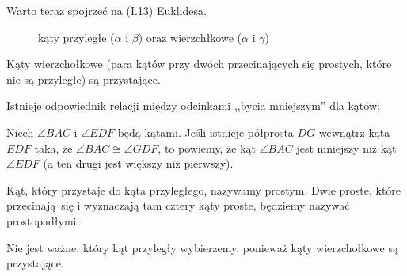 Warto teraz spojrzeć na (I.13) Euklidesa.

\begin{figure}[H] \centering
\begin{comment}
\begin{tikzpicture}[scale=.6]
    \tkzDefPoint(-4, -2){A}
    \tkzDefPoint(4, 2){B}
    \tkzDefPoint(4, -2){C}
    \tkzDefPoint(-4, 2){D}
    \tkzDefPoint(0, 0){Zero}
    \tkzDefPoint(0, 0.7){X1}
    \tkzDefPoint(-1.7, 0){X2}
    \tkzDefPoint(1.7, 0){X3}
    \tkzMarkAngle[arc=l,size=1.2,mark=||](D,Zero,A)
    \tkzMarkAngle[arc=l,size=1.2,mark=||](C,Zero,B)
    \tkzMarkAngle[arc=ll,size=1.2](B,Zero,D)

    \tkzDrawSegments[line width=0.3mm](A,B)
    \tkzDrawSegments[line width=0.3mm](C,D)
    \tkzLabelPoint[anchor=center](X1){$\beta$}
    \tkzLabelPoint[anchor=center](X2){$\alpha$}
    \tkzLabelPoint[anchor=center](X3){$\gamma$}

\end{tikzpicture}
\end{comment}
    \caption{kąty przyległe ($\alpha$ i $\beta$) oraz wierzchłkowe ($\alpha$ i $\gamma$)}
\end{figure}

\begin{proposition}
    Kąty wierzchołkowe (para kątów przy dwóch przecinających się prostych, które nie są przyległe) są przystające.
\end{proposition}


Istnieje odpowiednik relacji między odcinkami ,,bycia mniejszym'' dla kątów:

\begin{definition}
    Niech $\angle BAC$ i $\angle EDF$ będą kątami.
    Jeśli istnieje półprosta $DG$ wewnątrz kąta $EDF$ taka, że $\angle BAC \cong \angle GDF$, to powiemy, że kąt $\angle BAC$ jest mniejszy niż kąt $\angle EDF$ (a ten drugi jest większy niż pierwszy).
\end{definition}

\begin{definition}
    Kąt, który przystaje do kąta przyległego, nazywamy prostym.
    Dwie proste, które przecinają się i wyznaczają tam cztery kąty proste, będziemy nazywać prostopadłymi.
\end{definition}

Nie jest ważne, który kąt przyległy wybierzemy, ponieważ kąty wierzchołkowe są przystające.
